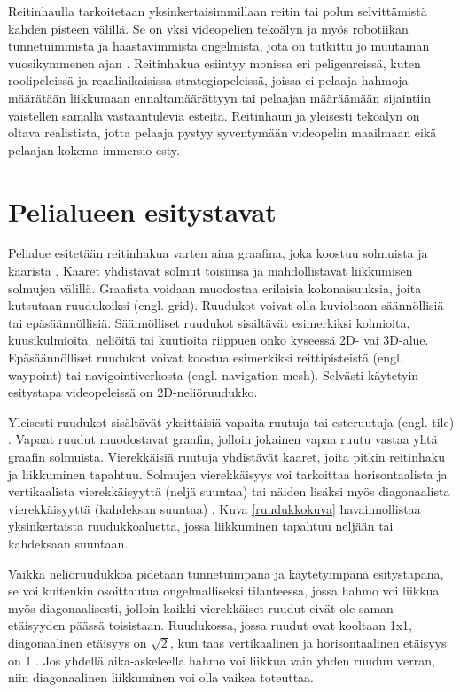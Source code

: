 \documentclass[utf8]{gradu3}
\begin{document}
Reitinhaulla tarkoitetaan yksinkertaisimmillaan reitin tai polun selvittämistä kahden pisteen välillä. Se on yksi videopelien tekoälyn ja myös robotiikan tunnetuimmista ja haastavimmista ongelmista, jota on tutkittu jo muutaman vuosikymmenen ajan \parencite{abd2015comprehensive,cui2011based}. Reitinhakua esiintyy monissa eri peligenreissä, kuten roolipeleissä ja reaaliaikaisissa strategiapeleissä, joissa ei-pelaaja-hahmoja määrätään liikkumaan ennaltamäärättyyn tai pelaajan määräämään sijaintiin väistellen samalla vastaantulevia esteitä. Reitinhaun ja yleisesti tekoälyn on oltava realistista, jotta pelaaja pystyy syventymään videopelin maailmaan eikä pelaajan kokema immersio esty.

\section{Pelialueen esitystavat}

Pelialue esitetään reitinhakua varten aina graafina, joka koostuu solmuista ja kaarista \parencite{lawande2022systematic}. Kaaret yhdistävät solmut toisiinsa ja mahdollistavat liikkumisen solmujen välillä. Graafista voidaan muodostaa erilaisia kokonaisuuksia, joita kutsutaan ruudukoiksi (engl. grid). Ruudukot voivat olla kuvioltaan säännöllisiä tai epäsäännöllisiä. Säännölliset ruudukot sisältävät esimerkiksi kolmioita, kuusikulmioita, neliöitä tai kuutioita riippuen onko kyseessä 2D- vai 3D-alue. Epäsäännölliset ruudukot voivat koostua esimerkiksi reittipisteistä (engl. waypoint) tai navigointiverkosta (engl. navigation mesh). Selvästi käytetyin esitystapa videopeleissä on 2D-neliöruudukko.

Yleisesti ruudukot sisältävät yksittäisiä vapaita ruutuja tai esteruutuja (engl. tile) \parencite{botea2013pathfinding}. Vapaat ruudut muodostavat graafin, jolloin jokainen vapaa ruutu vastaa yhtä graafin solmuista. Vierekkäisiä ruutuja yhdistävät kaaret, joita pitkin reitinhaku ja liikkuminen tapahtuu. Solmujen vierekkäisyys voi tarkoittaa horisontaalista ja vertikaalista vierekkäisyyttä (neljä suuntaa) tai näiden lisäksi myös diagonaalista vierekkäisyyttä (kahdeksan suuntaa) \parencite{abd2015comprehensive,botea2013pathfinding}. Kuva \ref{ruudukkokuva} havainnollistaa yksinkertaista ruudukkoaluetta, jossa liikkuminen tapahtuu neljään tai kahdeksaan suuntaan.

Vaikka neliöruudukkoa pidetään tunnetuimpana ja käytetyimpänä esitystapana, se voi kuitenkin osoittautua ongelmalliseksi tilanteessa, jossa hahmo voi liikkua myös diagonaalisesti, jolloin kaikki vierekkäiset ruudut eivät ole saman etäisyyden päässä toisistaan. Ruudukossa, jossa ruudut ovat kooltaan 1x1, diagonaalinen etäisyys on $\sqrt{2}$, kun taas vertikaalinen ja horisontaalinen etäisyys on 1 \parencite{panov2018grid}. Jos yhdellä aika-askeleella hahmo voi liikkua vain yhden ruudun verran, niin diagonaalinen liikkuminen voi olla vaikea toteuttaa.
\end{document}
